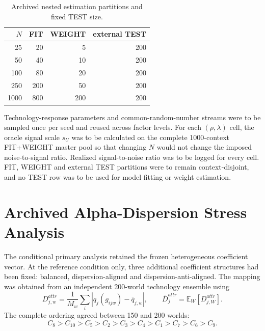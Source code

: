\documentclass[runningheads,orivec]{llncs}
\newcommand{\E}{\mathbb{E}}
\begin{document}
\begin{table}[t]
\centering
\caption{Archived nested estimation partitions and fixed TEST size.}
\label{supp:tab:partitions}
\small
\begin{tabular}{@{}rrrr@{}}
\toprule
$N$ & FIT & WEIGHT & external TEST\\
\midrule
25 & 20 & 5 & 200\\
50 & 40 & 10 & 200\\
100 & 80 & 20 & 200\\
250 & 200 & 50 & 200\\
1000 & 800 & 200 & 200\\
\bottomrule
\end{tabular}
\end{table}

Technology-response parameters and common-random-number streams were to be sampled once per
seed and reused across factor levels. For each $(\rho,\lambda)$ cell, the oracle signal scale
$s_U$ was to be calculated on the complete 1000-context FIT+WEIGHT master pool so that changing
$N$ would not change the imposed noise-to-signal ratio. Realized signal-to-noise ratio was to
be logged for every cell. FIT, WEIGHT and external TEST partitions were to remain
context-disjoint, and no TEST row was to be used for model fitting or weight estimation.

\section{Archived Alpha-Dispersion Stress Analysis}

The conditional primary analysis retained the frozen heterogeneous coefficient vector. At the
reference condition only, three additional coefficient structures had been fixed: balanced,
dispersion-aligned and dispersion-anti-aligned. The mapping was obtained from an independent
200-world technology ensemble using
\begin{equation}
D_{j,w}^{attr}
=\frac{1}{M_w}\sum_i\left|q_j(g_{ijw})-\bar q_{j,w}\right|,
\qquad
\bar D_j^{attr}=\E_W[D_{j,W}^{attr}].
\label{supp:eq:qmad}
\end{equation}
The complete ordering agreed between 150 and 200 worlds:
\begin{equation}
C_8>C_{10}>C_5>C_2>C_3>C_4>C_1>C_7>C_6>C_9.
\label{supp:eq:d3order}
\end{equation}
\end{document}
